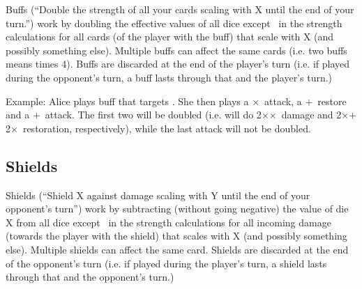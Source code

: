 \documentclass[dvipsnames,parskip,a4paper]{scrartcl}
\newcommand{\iconsize}{3.4mm}
\newcommand{\icondepth}{0.45mm}
\newcommand{\icon}[1]{\raisebox{-\icondepth}{\texttt{[image:  \#1 ]}}}
\newcommand{\fire}{\icon{icons/fire.png}}
\newcommand{\earth}{\icon{icons/earth.png}}
\newcommand{\water}{\icon{icons/water.png}}
\newcommand{\nature}{\icon{icons/nature.png}}
\newcommand{\magic}{\icon{icons/magic.png}}
\begin{document}
Buffs (``Double the strength of all your cards scaling with X until the end of your turn.'') work by doubling the effective values of all dice except \magic \ in the strength calculations for all cards (of the player with the buff) that scale with X (and possibly something else). Multiple buffs can affect the same cards (i.e. two buffs means times 4). Buffs are discarded at the end of the player's turn (i.e. if played during the opponent's turn, a buff lasts through that and the player's turn.)

\vspace{4pt}

Example: Alice plays buff that targets \fire. She then plays a \fire\hspace{1pt}$\times$\hspace{1pt}\magic \ attack, a \nature\hspace{1pt}$+$\hspace{1pt}\fire \ restore and a \water\hspace{1pt}$+$\hspace{1pt}\earth \ attack. The first two will be doubled (i.e. will do 2\hspace{1pt}$\times$\hspace{1pt}\fire\hspace{1pt}$\times$\hspace{1pt}\magic \ damage and 2\hspace{1pt}$\times$\hspace{1pt}\nature\hspace{1pt}$+$\hspace{1pt}2\hspace{1pt}$\times$\hspace{1pt}\fire \ restoration, respectively), while the last attack will not be doubled.

\subsection*{Shields}

Shields (``Shield X against damage scaling with Y until the end of your opponent's turn'') work by subtracting (without going negative) the value of die X from all dice except \magic \ in the strength calculations for all incoming damage (towards the player with the shield) that scales with X (and possibly something else). Multiple shields can affect the same card. Shields are discarded at the end of the opponent's turn (i.e. if played during the player's turn, a shield lasts through that and the opponent's turn.)
\end{document}
